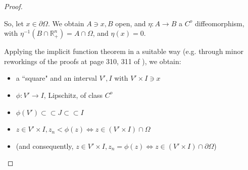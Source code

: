 \documentclass[english,a4paper,9pt,oneside]{scrbook}	%
\theoremstyle{break}
\newenvironment{mproof}[1][\proofname]{%
  \begin{proof}[#1]$ $\par\nobreak\ignorespaces
}{%
  \end{proof}
}
\renewcommand*{\proofname}{Proof}
\theoremstyle{remark}
\newcommand{\mR}{\mathbb{R}}
\newcommand{\cc}{\subset\subset}
\begin{document}
\begin{mproof}
So, let $x\in \partial \Omega$. We obtain $A\ni x, B$ open, and $\eta: A\rightarrow B$ a $C^o$ diffeomorphism, with $\eta^{-1}(B\cap \mR^n_+)=A\cap \Omega$, and $\eta(x)=0$.
%
%
%
%
%
%
%
%

Applying the implicit function theorem in a suitable way (e.g. through minor reworkings of the proofs at page 310, 311 of \cite{gilardi2}), we obtain:

\begin{itemize}
	\item a ``square" and an interval $V', I$ with $V'\times I \ni x$
	\item $\phi: V'\rightarrow I$, Lipschitz, of class $C^o$
	\item $\phi(V') \cc J \cc I$
	\item $z \in V'\times I, z_n<\phi(z) \iff z \in (V'\times I)\cap \Omega$
	\item (and consequently, $z \in V'\times I, z_n=\phi(z) \iff z \in (V'\times I)\cap \partial \Omega$)
\end{itemize}



\end{mproof}
\end{document}
